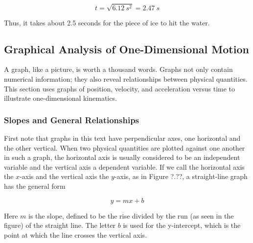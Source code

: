 \documentclass[main-ap-physics.tex]{subfiles}
\begin{document}
\begin{equation*}
    t = \sqrt{\SI{6.12}{s^2}} = \SI{2.47}{s}
\end{equation*}

Thus, it takes about 2.5 seconds for the piece of ice to hit the water.

\endsolution


\subsection{Graphical Analysis of One-Dimensional Motion}

A graph, like a picture, is worth a thousand words. Graphs not only contain numerical information; they also reveal relationships between physical quantities. This section uses graphs of position, velocity, and acceleration versus time to illustrate one-dimensional kinematics.

\subsubsection*{Slopes and General Relationships}

First note that graphs in this text have perpendicular axes, one horizontal and the other vertical. When two physical quantities are plotted against one another in such a graph, the horizontal axis is usually considered to be an \gls{independent variable} and the vertical axis a \gls{dependent variable}. If we call the horizontal axis the  $x$-axis and the vertical axis the $y$-axis, as in Figure ?.??, a straight-line graph has the general form

\begin{equation}
    y = mx + b
\end{equation}

Here $m$ is the \gls{slope}, defined to be the rise divided by the run (as seen in the figure) of the straight line. The letter $b$ is used for the \gls{y-intercept}, which is the point at which the line crosses the vertical axis.

\begin{center}
\end{center}
\end{document}

